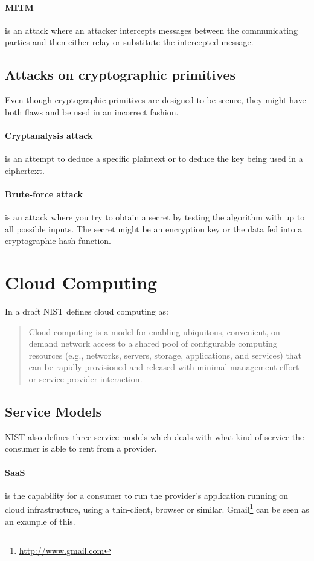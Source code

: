 \documentclass[pdftex,english,10pt,b5paper,twoside]{book}
\begin{document}
\paragraph{\acl{MITM}} is an attack where an attacker intercepts messages
between the communicating parties and then either relay or substitute the
intercepted message.

\subsection{Attacks on cryptographic primitives}
Even though cryptographic primitives are designed to be secure, they might have
both flaws and be used in an incorrect fashion.

\paragraph{Cryptanalysis attack} is an attempt to deduce a specific plaintext
or to deduce the key being used in a ciphertext.

\paragraph{Brute-force attack} is an attack where you try to obtain a secret by
testing the algorithm with up to all possible inputs. The secret might be an
encryption key or the data fed into a cryptographic hash function.

\section{Cloud Computing}
In a draft\cite{cloud_nistdef} \ac{NIST} defines cloud computing as:
\begin{quote}
Cloud computing is a model for enabling ubiquitous, convenient,
on-demand network access to a shared pool of configurable computing resources
(e.g., networks, servers, storage, applications, and services) that can be
rapidly provisioned and released with minimal management effort or service
provider interaction.
\end{quote}

\subsection{Service Models}
\ac{NIST} also defines three service models which deals with what kind of
service the consumer is able to rent from a provider.

\paragraph{\ac{SaaS}} is the capability for a consumer to run the provider's
application running on cloud infrastructure, using a thin-client, browser or
similar. Gmail\footnote{\url{http://www.gmail.com}} can be seen as an example
of this.
\end{document}
